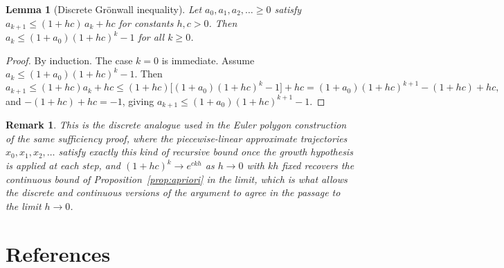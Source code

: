 \documentclass[11pt]{report}
\newtheorem{lemma}{Lemma}[chapter]
\newtheorem{remark}{Remark}[chapter]
\begin{document}
\begin{lemma}[Discrete Gr\"onwall inequality]
Let $a_0, a_1, a_2, \dots \geq 0$ satisfy $a_{k+1} \leq (1+hc)\,a_k + hc$
for constants $h, c > 0$. Then $a_k \leq (1+a_0)(1+hc)^k - 1$ for all
$k \geq 0$.
\end{lemma}
\begin{proof}
By induction. The case $k=0$ is immediate. Assume
$a_k \leq (1+a_0)(1+hc)^k - 1$. Then
\[
a_{k+1} \leq (1+hc)a_k + hc \leq (1+hc)\big[(1+a_0)(1+hc)^k - 1\big] + hc
= (1+a_0)(1+hc)^{k+1} - (1+hc) + hc,
\]
and $-(1+hc)+hc = -1$, giving $a_{k+1} \leq (1+a_0)(1+hc)^{k+1} - 1$.
\end{proof}

\begin{remark}
This is the discrete analogue used in the Euler polygon construction of
the same sufficiency proof, where the piecewise-linear approximate
trajectories $x_0, x_1, x_2, \dots$ satisfy exactly this kind of
recursive bound once the growth hypothesis is applied at each step, and
$(1+hc)^k \to e^{ckh}$ as $h \to 0$ with $kh$ fixed recovers the
continuous bound of Proposition~\ref{prop:apriori} in the limit, which
is what allows the discrete and continuous versions of the argument to
agree in the passage to the limit $h \to 0$.
\end{remark}

\chapter*{References}
\end{document}
